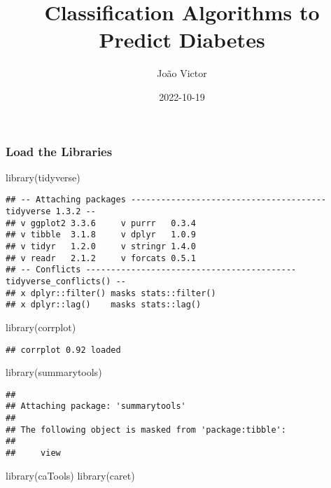 \documentclass[
]{article}
\title{Classification Algorithms to Predict Diabetes}
\author{João Victor}
\date{2022-10-19}
\newenvironment{Shaded}{\begin{snugshade}}{\end{snugshade}}
\newcommand{\FunctionTok}[1]{\textcolor[rgb]{0.00,0.00,0.00}{#1}}
\newcommand{\NormalTok}[1]{#1}
\begin{document}
\maketitle

\hypertarget{load-the-libraries}{%
\subsubsection{Load the Libraries}\label{load-the-libraries}}

\begin{Shaded}
\begin{Highlighting}[]
\FunctionTok{library}\NormalTok{(tidyverse)}
\end{Highlighting}
\end{Shaded}

\begin{verbatim}
## -- Attaching packages --------------------------------------- tidyverse 1.3.2 --
## v ggplot2 3.3.6     v purrr   0.3.4
## v tibble  3.1.8     v dplyr   1.0.9
## v tidyr   1.2.0     v stringr 1.4.0
## v readr   2.1.2     v forcats 0.5.1
## -- Conflicts ------------------------------------------ tidyverse_conflicts() --
## x dplyr::filter() masks stats::filter()
## x dplyr::lag()    masks stats::lag()
\end{verbatim}

\begin{Shaded}
\begin{Highlighting}[]
\FunctionTok{library}\NormalTok{(corrplot)}
\end{Highlighting}
\end{Shaded}

\begin{verbatim}
## corrplot 0.92 loaded
\end{verbatim}

\begin{Shaded}
\begin{Highlighting}[]
\FunctionTok{library}\NormalTok{(summarytools)}
\end{Highlighting}
\end{Shaded}

\begin{verbatim}
## 
## Attaching package: 'summarytools'
## 
## The following object is masked from 'package:tibble':
## 
##     view
\end{verbatim}

\begin{Shaded}
\begin{Highlighting}[]
\FunctionTok{library}\NormalTok{(caTools)}
\FunctionTok{library}\NormalTok{(caret)}
\end{Highlighting}
\end{Shaded}
\end{document}
